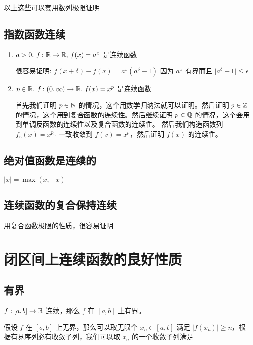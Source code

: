 以上这些可以套用数列极限证明

\subsection{指数函数连续}

\begin{enumerate}
    \item $a > 0,\, f: \mathbb{R} \to \mathbb{R},\, f(x) = a^x$ 是连续函数

    很容易证明: $f(x+\delta) - f(x) = a^x(a^{\delta} - 1)$ 因为 $a^x$ 有界而且 $\lvert a^{\delta} -1 \rvert \le \epsilon$


    \item $p \in \mathbb{R},\, f: (0,\infty) \to \mathbb{R},\, f(x) = x^p$ 是连续函数

    首先我们证明 $p \in \mathbb{N}$ 的情况，这个用数学归纳法就可以证明。然后证明 $p \in \mathbb{Z}$ 的情况，这个用到复合函数的连续性。然后继续证明 $p \in \mathbb{Q}$ 的情况，这个会用到单调反函数的连续性以及复合函数的连续性。
    然后我们构造函数列 $f_n(x) = x^{p_n}$ 一致收敛到 $f(x) = x^p$，然后证明 $f(x)$ 的连续性。

\end{enumerate}

\subsection{绝对值函数是连续的}

$\lvert x\rvert = \max(x, -x)$

\subsection{连续函数的复合保持连续}

用复合函数极限的性质，很容易证明


\section{闭区间上连续函数的良好性质}

\subsection{有界}

$f: [a,b] \to \mathbb{R}$ 连续，那么 $f$ 在 $[a,b]$ 上有界。

假设 $f$ 在 $[a,b]$ 上无界，那么可以取无限个 $x_n \in [a,b]$ 满足 $\lvert f(x_n) \rvert \ge n$，根据有界序列必有收敛子列，我们可以取 $x_n$ 的一个收敛子列满足

